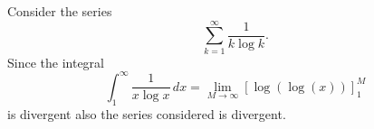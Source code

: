 \documentclass[12pt]{article}
\begin{document}
Consider the series
\[
   \sum_{k=1}^\infty \frac 1 {k \log k}.
\]
Since the integral
\[
   \int_1^\infty \frac 1 {x \log x}\, dx 
    = \lim_{M\to \infty} \left[\log (\log(x))\right]_1^M
\]
is divergent also the series considered is divergent.
\end{document}
